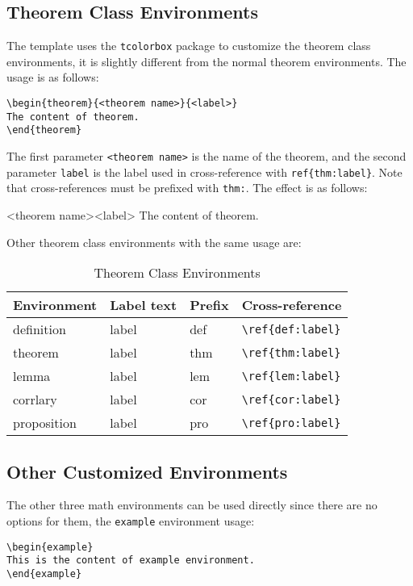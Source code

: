 \documentclass[noanswer,fancy,blue,11pt]{elegantbook}
\begin{document}
\subsection{Theorem Class Environments}
The template uses the \lstinline{tcolorbox} package to customize the theorem class environments, it is slightly different from the normal theorem environments. The usage is as follows:
\begin{lstlisting}
\begin{theorem}{<theorem name>}{<label>}
The content of theorem.
\end{theorem}
\end{lstlisting}

The first parameter \lstinline{<theorem name>} is the name of the theorem, and the second parameter \lstinline{label} is the label used in cross-reference with \verb|ref{thm:label}|. Note that cross-references must be prefixed with \lstinline{thm:}. The effect is as follows:

\begin{theorem}{<theorem name>}{<label>}
The content of theorem.
\end{theorem}

Other theorem class environments with the same usage are:

\begin{table}[htbp]
   \centering
   \caption{Theorem Class Environments}
     \begin{tabular}{llll}
     \toprule
     Environment & Label text & Prefix & Cross-reference \\
     \midrule
     definition & label & def   & \lstinline|\ref{def:label}| \\
     theorem & label & thm   & \lstinline|\ref{thm:label}| \\
     lemma & label & lem   & \lstinline|\ref{lem:label}| \\
     corrlary & label & cor   & \lstinline|\ref{cor:label}| \\
     proposition & label & pro   & \lstinline|\ref{pro:label}| \\
     \bottomrule
     \end{tabular}%
   \label{tab:theorem-class}%
 \end{table}%
 

\subsection{Other Customized Environments}
The other three math environments can be used directly since there are no options for them, the \lstinline{example} environment usage:
\begin{lstlisting}
\begin{example}
This is the content of example environment.
\end{example}
\end{lstlisting}
\end{document}
